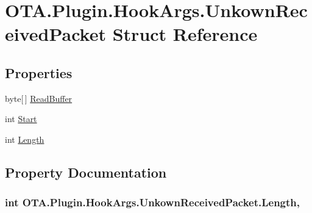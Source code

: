 \hypertarget{struct_o_t_a_1_1_plugin_1_1_hook_args_1_1_unkown_received_packet}{}\section{O\+T\+A.\+Plugin.\+Hook\+Args.\+Unkown\+Received\+Packet Struct Reference}
\label{struct_o_t_a_1_1_plugin_1_1_hook_args_1_1_unkown_received_packet}
\subsection*{Properties}
\begin{DoxyCompactItemize}
\item 
byte\mbox{[}$\,$\mbox{]} \hyperlink{struct_o_t_a_1_1_plugin_1_1_hook_args_1_1_unkown_received_packet_a65c574a48ec9e18539e4d63823172abb}{Read\+Buffer}
\item 
int \hyperlink{struct_o_t_a_1_1_plugin_1_1_hook_args_1_1_unkown_received_packet_ad97197d58e23b48e207c16828e249cba}{Start}
\item 
int \hyperlink{struct_o_t_a_1_1_plugin_1_1_hook_args_1_1_unkown_received_packet_a14921cf55132e70a1492887e14688c63}{Length}
\end{DoxyCompactItemize}


\subsection{Property Documentation}
\hypertarget{struct_o_t_a_1_1_plugin_1_1_hook_args_1_1_unkown_received_packet_a14921cf55132e70a1492887e14688c63}{}
\subsubsection[{Length}]{\setlength{\rightskip}{0pt plus 5cm}int O\+T\+A.\+Plugin.\+Hook\+Args.\+Unkown\+Received\+Packet.\+Length\hspace{0.3cm}{\ttfamily [get]}, {\ttfamily [set]}}\label{struct_o_t_a_1_1_plugin_1_1_hook_args_1_1_unkown_received_packet_a14921cf55132e70a1492887e14688c63}
\hypertarget{struct_o_t_a_1_1_plugin_1_1_hook_args_1_1_unkown_received_packet_a65c574a48ec9e18539e4d63823172abb}{}
